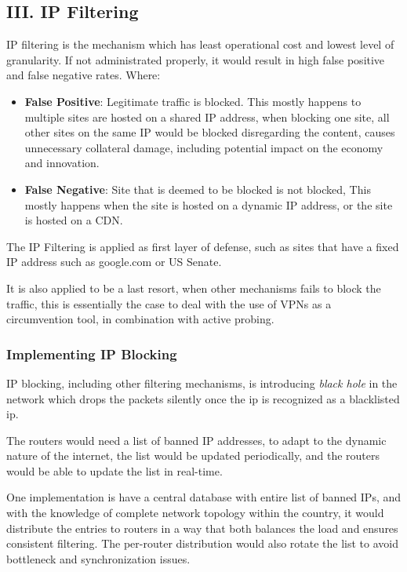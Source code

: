 \documentclass[sigconf]{acmart}
\begin{document}
\hypertarget{iii.-ip-filtering}{%
\subsection{III. IP Filtering}\label{iii.-ip-filtering}}

IP filtering is the mechanism which has least operational cost and
lowest level of granularity. \cite{07_taxonomy} If not administrated
properly, it would result in high false positive and false negative
rates. Where:

\begin{itemize}
\tightlist
\item
  \textbf{False Positive}: Legitimate traffic is blocked. This mostly
  happens to multiple sites are hosted on a shared IP address, when
  blocking one site, all other sites on the same IP would be blocked
  disregarding the content, causes unnecessary collateral damage,
  including potential impact on the economy and innovation.
\item
  \textbf{False Negative}: Site that is deemed to be blocked is not
  blocked, This mostly happens when the site is hosted on a dynamic IP
  address, or the site is hosted on a CDN.
\end{itemize}

The IP Filtering is applied as first layer of defense, such as sites
that have a fixed IP address such as google.com or US Senate.

It is also applied to be a last resort, when other mechanisms fails to
block the traffic, this is essentially the case to deal with the use of
VPNs as a circumvention tool, in combination with active probing.

\hypertarget{implementing-ip-blocking}{%
\subsubsection{Implementing IP
Blocking}\label{implementing-ip-blocking}}

IP blocking, including other filtering mechanisms, is introducing
\emph{black hole} in the network which drops the packets silently once
the ip is recognized as a blacklisted ip.

The routers would need a list of banned IP addresses, to adapt to the
dynamic nature of the internet, the list would be updated periodically,
and the routers would be able to update the list in real-time.

One implementation is have a central database with entire list of banned
IPs, and with the knowledge of complete network topology within the
country, it would distribute the entries to routers in a way that both
balances the load and ensures consistent filtering. The per-router
distribution would also rotate the list to avoid bottleneck and
synchronization issues.
\end{document}
